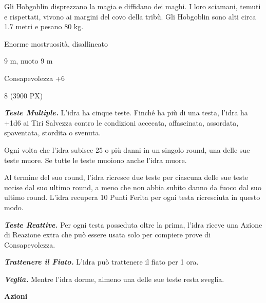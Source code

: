 \begin{multicols}{2}
{Gli Hobgoblin disprezzano la magia e diffidano dei maghi. I loro sciamani, temuti e rispettati, vivono ai margini del covo della tribù. Gli Hobgoblin sono alti circa 1.7 metri e pesano 80 kg.

\begin{description}[noitemsep, topsep=0pt, parsep=0pt, partopsep=0pt, itemsep=1pt, leftmargin=2.35cm,  labelwidth=2.2cm, itemindent=0cm, listparindent=0pt] %
\setlength{\baselineskip}{10pt}
\item[\textbf{Taglia/Tipo}] Enorme mostruosità, disallineato
\item[\textbf{Caratt.}] 
\item[\textbf{Punti Ferita}] 
\item[\textbf{Movimento}] 9 m, nuoto 9 m
\item[\textbf{Tiri Salvez.}] 
\item[\textbf{Comp.}] Consapevolezza +6
\item[\textbf{Sensi}] 
\item[\textbf{Sfida}] 8 (3900 PX)
\end{description}
\smallskip

\emph{\textbf{Teste Multiple.}} L'idra ha cinque teste. Finché ha più di una testa, l'idra ha +1d6 ai Tiri Salvezza contro le condizioni accecata, affascinata, assordata, spaventata, stordita o svenuta.

Ogni volta che l'idra subisce 25 o più danni in un singolo round, una delle sue teste muore. Se tutte le teste muoiono anche l'idra muore.

Al termine del suo round, l'idra ricresce due teste per ciascuna delle sue teste uccise dal suo ultimo round, a meno che non abbia subito danno da fuoco dal suo ultimo round. L'idra recupera 10 Punti Ferita per ogni testa ricresciuta in questo modo.

\emph{\textbf{Teste Reattive.}} Per ogni testa posseduta oltre la prima, l'idra riceve una Azione di Reazione extra che può essere usata solo per compiere prove di Consapevolezza.

\emph{\textbf{Trattenere il Fiato.}} L'idra può trattenere il fiato per 1 ora.

\emph{\textbf{Veglia.}} Mentre l'idra dorme, almeno una delle sue teste resta sveglia.

\textbf{Azioni}

}
\end{multicols}
